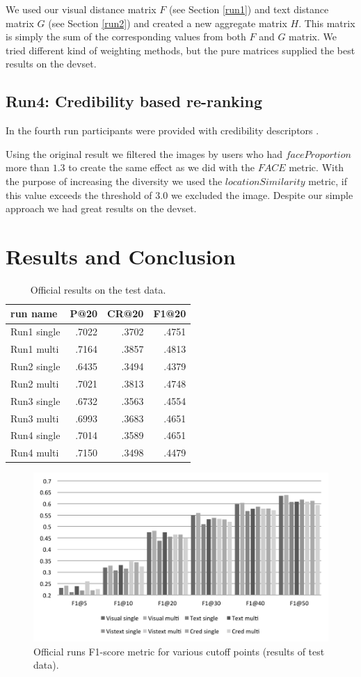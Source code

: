\documentclass{acm_proc_article-me}
\begin{document}
We used our visual distance matrix $F$ (see Section \ref{run1}) and text distance matrix $G$ (see Section \ref{run2}) and created a new aggregate matrix $H$. This matrix is simply the sum of the corresponding values from both $F$ and $G$ matrix. We tried different kind of weighting methods, but the pure matrices supplied the best results on the devset.

\subsection{Run4: Credibility based re-ranking}
In the fourth run participants were provided with credibility descriptors \cite{Task2015}.

Using the original result we filtered the images by users who had $faceProportion$ more than $1.3$ to create the same effect as we did with the $FACE$ metric. With the purpose of increasing the diversity we used the $locationSimilarity$ metric, if this value exceeds the threshold of $3.0$ we excluded the image. Despite our simple approach we had great results on the devset.

\section{Results and Conclusion}

\begin{table}[h]
	\centering
\begin{tabular}{|l|r|r|r|}
	\hline 
	run name & P@20 & CR@20 & F1@20\tabularnewline
	\hline 
	\hline 
	Run1 single & .7022 & .3702 & .4751\tabularnewline
	\hline 
	Run1 multi & .7164 & .3857 & .4813\tabularnewline
	\hline 
	Run2 single & .6435 & .3494 & .4379\tabularnewline
	\hline 
	Run2 multi & .7021 & .3813 & .4748\tabularnewline
	\hline 
	Run3 single & .6732 & .3563 & .4554\tabularnewline
	\hline 
	Run3 multi & .6993 & .3683 & .4651\tabularnewline
	\hline 
	Run4 single & .7014 & .3589 & .4651\tabularnewline
	\hline 
	Run4 multi & .7150 & .3498 & .4479\tabularnewline
	\hline
\end{tabular}
\label{table:results}
\caption{Official results on the test data.}
\end{table}

\begin{figure}[h]
\includegraphics[width=1.0\linewidth]{f1}
\caption{Official runs F1-score metric for various cutoff points (results of test data).}
\label{fig:f1}
\end{figure}
\end{document}
